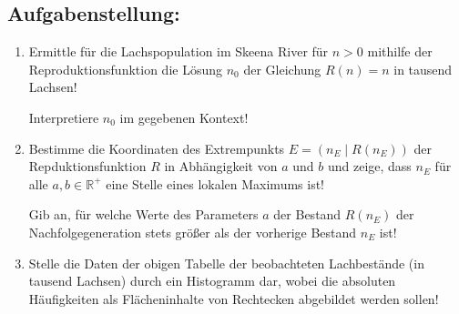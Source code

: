 \begin{langesbeispiel}
\subsection{Aufgabenstellung:}
\begin{enumerate}
	\item Ermittle für die Lachspopulation im Skeena River für $n>0$ mithilfe der Reproduktionsfunktion die Lösung $n_0$ der Gleichung $R(n)=n$ in tausend Lachsen!
	
	 Interpretiere $n_0$ im gegebenen Kontext!
		
	\item Bestimme die Koordinaten des Extrempunkts $E=(n_E\mid R(n_E))$ der Repduktionsfunktion $R$ in Abhängigkeit von $a$ und $b$ und zeige, dass $n_E$ für alle $a, b\in\mathbb{R}^+$ eine Stelle eines lokalen Maximums ist!
	
	Gib an, für welche Werte des Parameters $a$ der Bestand $R(n_E)$ der Nachfolgegeneration stets größer als der vorherige Bestand $n_E$ ist!
	
	\item Stelle die Daten der obigen Tabelle der beobachteten Lachbestände (in tausend Lachsen) durch ein Histogramm dar, wobei die absoluten Häufigkeiten als Flächeninhalte von Rechtecken abgebildet werden sollen!
	

\end{enumerate}
\end{langesbeispiel}

